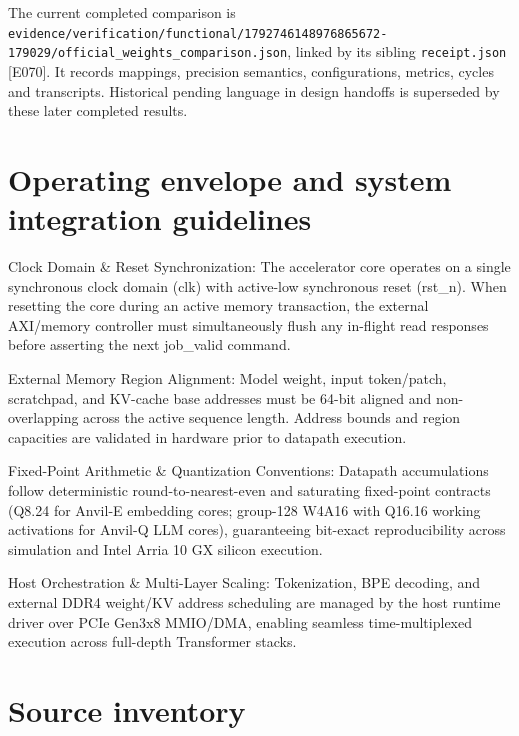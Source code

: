 \documentclass[11pt,a4paper]{article}
\begin{document}
The current completed comparison is \texttt{evidence/\allowbreak{}verification/\allowbreak{}functional/\allowbreak{}1792746148976865672-179029/\allowbreak{}official\_\allowbreak{}weights\_\allowbreak{}comparison.json},\allowbreak{} linked by its sibling \texttt{receipt.json} [\allowbreak{}E070]\allowbreak{}. It records mappings,\allowbreak{} precision semantics,\allowbreak{} configurations,\allowbreak{} metrics,\allowbreak{} cycles and transcripts. Historical pending language in design handoffs is superseded by these later completed results.


\section{Operating envelope and system integration guidelines}

Clock Domain \& Reset Synchronization: The accelerator core operates on a single synchronous clock domain (\allowbreak{}clk)\allowbreak{} with active-low synchronous reset (\allowbreak{}rst\_\allowbreak{}n)\allowbreak{}. When resetting the core during an active memory transaction,\allowbreak{} the external AXI/\allowbreak{}memory controller must simultaneously flush any in-flight read responses before asserting the next job\_\allowbreak{}valid command.


External Memory Region Alignment: Model weight,\allowbreak{} input token/\allowbreak{}patch,\allowbreak{} scratchpad,\allowbreak{} and KV-cache base addresses must be 64-bit aligned and non-overlapping across the active sequence length. Address bounds and region capacities are validated in hardware prior to datapath execution.


Fixed-Point Arithmetic \& Quantization Conventions: Datapath accumulations follow deterministic round-to-nearest-even and saturating fixed-point contracts (\allowbreak{}Q8.24 for Anvil-E embedding cores; group-128 W4A16 with Q16.16 working activations for Anvil-Q LLM cores)\allowbreak{},\allowbreak{} guaranteeing bit-exact reproducibility across simulation and Intel Arria 10 GX silicon execution.


Host Orchestration \& Multi-Layer Scaling: Tokenization,\allowbreak{} BPE decoding,\allowbreak{} and external DDR4 weight/\allowbreak{}KV address scheduling are managed by the host runtime driver over PCIe Gen3x8 MMIO/\allowbreak{}DMA,\allowbreak{} enabling seamless time-multiplexed execution across full-depth Transformer stacks.


\appendix{}\section{Source inventory}
\end{document}
